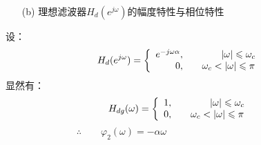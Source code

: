 \documentclass[notheorems,compress,mathserif,table]{beamer}
\begin{document}
\begin{frame}\frametitle{}%

      \begin{itemize}
      \item[(b)] 理想滤波器$H_d(e^{j\omega})$的幅度特性与相位特性
      \end{itemize}
          设：
          $$
            H_d(e^{j\omega}) =
            \left\{\begin{array}
                 {r@{,\quad}l}
                 e^{-j\omega\alpha} & \quad\quad\quad|\omega|\leqslant \omega_c\\
                 0                  & \quad\omega_c<|\omega|\leqslant \pi
            \end{array} \right.
          $$
          显然有：
          $$
            H_{dg}(\omega) =
            \left\{\begin{array}
                 {r@{,\quad}l}
                 1 & \quad\quad\quad|\omega|\leqslant \omega_c\\
                 0 & \quad\omega_c<|\omega|\leqslant \pi
            \end{array} \right.
          $$
          $$\therefore\quad\quad \varphi_2(\omega) = -\alpha\omega
          \quad\quad\quad\quad\quad\quad\quad\quad\quad\quad\quad\quad$$
\end{frame}
\end{document}
